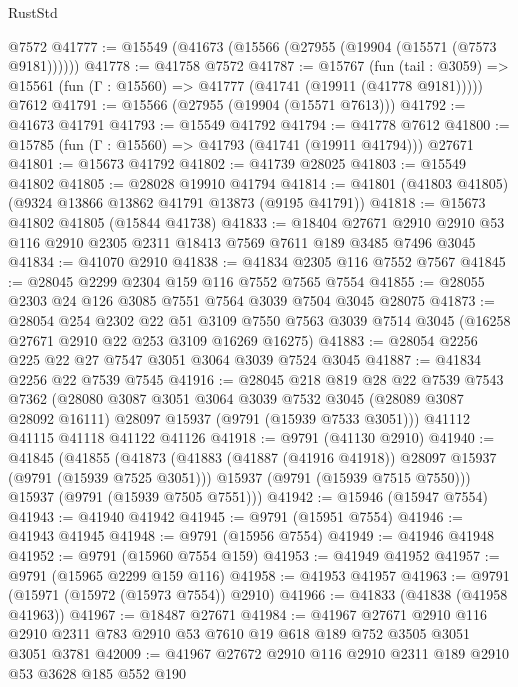 \begin{lexlean}{RustStd}
\begin{coremodule}
    @7572
@41777 := @15549 (@41673 (@15566 (@27955 (@19904 (@15571 (@7573 @9181))))))
@41778 := @41758 @7572
@41787 := @15767
    (fun (tail : @3059) => @15561 (fun (Γ : @15560) => @41777 (@41741 (@19911 (@41778 @9181)))))
    @7612
@41791 := @15566 (@27955 (@19904 (@15571 @7613)))
@41792 := @41673 @41791
@41793 := @15549 @41792
@41794 := @41778 @7612
@41800 := @15785 (fun (Γ : @15560) => @41793 (@41741 (@19911 @41794))) @27671
@41801 := @15673 @41792
@41802 := @41739 @28025
@41803 := @15549 @41802
@41805 := @28028 @19910 @41794
@41814 := @41801 (@41803 @41805) (@9324 @13866 @13862 @41791 @13873 (@9195 @41791))
@41818 := @15673 @41802 @41805 (@15844 @41738)
@41833 := @18404
    @27671
    @2910
    @2910
    @53
    @116
    @2910
    @2305
    @2311
    @18413
    @7569
    @7611
    @189
    @3485
    @7496
    @3045
@41834 := @41070 @2910
@41838 := @41834 @2305 @116 @7552 @7567
@41845 := @28045 @2299 @2304 @159 @116 @7552 @7565 @7554
@41855 := @28055 @2303 @24 @126 @3085 @7551 @7564 @3039 @7504 @3045 @28075
@41873 := @28054
    @254
    @2302
    @22
    @51
    @3109
    @7550
    @7563
    @3039
    @7514
    @3045
    (@16258 @27671 @2910 @22 @253 @3109 @16269 @16275)
@41883 := @28054 @2256 @225 @22 @27 @7547 @3051 @3064 @3039 @7524 @3045
@41887 := @41834 @2256 @22 @7539 @7545
@41916 := @28045
    @218
    @819
    @28
    @22
    @7539
    @7543
    @7362
    (@28080
      @3087
      @3051
      @3064
      @3039
      @7532
      @3045
      (@28089 @3087 @28092 @16111)
      @28097
      @15937
      (@9791 (@15939 @7533 @3051)))
    @41112
    @41115
    @41118
    @41122
    @41126
@41918 := @9791 (@41130 @2910)
@41940 := @41845
    (@41855
      (@41873
        (@41883 (@41887 (@41916 @41918)) @28097 @15937 (@9791 (@15939 @7525 @3051)))
        @15937
        (@9791 (@15939 @7515 @7550)))
      @15937
      (@9791 (@15939 @7505 @7551)))
@41942 := @15946 (@15947 @7554)
@41943 := @41940 @41942
@41945 := @9791 (@15951 @7554)
@41946 := @41943 @41945
@41948 := @9791 (@15956 @7554)
@41949 := @41946 @41948
@41952 := @9791 (@15960 @7554 @159)
@41953 := @41949 @41952
@41957 := @9791 (@15965 @2299 @159 @116)
@41958 := @41953 @41957
@41963 := @9791 (@15971 (@15972 (@15973 @7554)) @2910)
@41966 := @41833 (@41838 (@41958 @41963))
@41967 := @18487 @27671
@41984 := @41967
    @27671
    @2910
    @116
    @2910
    @2311
    @783
    @2910
    @53
    @7610
    @19
    @618
    @189
    @752
    @3505
    @3051
    @3051
    @3781
@42009 := @41967
    @27672
    @2910
    @116
    @2910
    @2311
    @189
    @2910
    @53
    @3628
    @185
    @552
    @190

\end{coremodule}
\end{lexlean}
